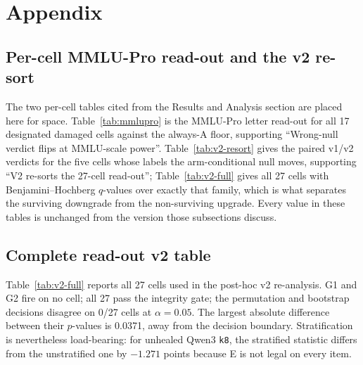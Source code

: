 \section{Appendix}




\subsection{Per-cell MMLU-Pro read-out and the v2 re-sort}
\label{app:mmlupro-and-resort}

The two per-cell tables cited from the Results and Analysis section are placed here
for space. Table~\ref{tab:mmlupro} is the MMLU-Pro letter read-out for all 17
designated damaged cells against the always-A floor, supporting
``Wrong-null verdict flips at MMLU-scale power''. Table~\ref{tab:v2-resort} gives the
paired v1/v2 verdicts for the five cells whose labels the arm-conditional null moves,
supporting ``V2 re-sorts the 27-cell read-out''; Table~\ref{tab:v2-full} gives all 27
cells with Benjamini--Hochberg $q$-values over exactly that family, which is what
separates the surviving downgrade from the non-surviving upgrade. Every value in these
tables is unchanged from the version those subsections discuss.



\FloatBarrier



\FloatBarrier

\subsection{Complete read-out v2 table}

Table~\ref{tab:v2-full} reports all 27 cells used in the post-hoc v2 re-analysis. G1 and G2 fire on no cell; all 27 pass the integrity gate; the permutation and bootstrap decisions disagree on 0/27 cells at $\alpha=0.05$. The largest absolute difference between their $p$-values is 0.0371, away from the decision boundary. Stratification is nevertheless load-bearing: for unhealed Qwen3 \texttt{k8}, the stratified statistic differs from the unstratified one by $-1.271$ points because E is not legal on every item.


